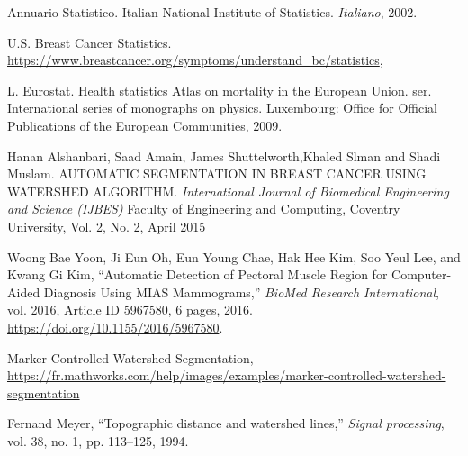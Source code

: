 \documentclass{article}
\begin{document}
%
%

\begin{thebibliography}{5}
    
	Annuario Statistico. Italian National Institute of Statistics. {\em Italiano},
	2002.
    
	U.S. Breast Cancer Statistics. \url{https://www.breastcancer.org/symptoms/understand_bc/statistics},

	L. Eurostat. Health statistics Atlas on mortality in the European Union. ser. International series of monographs on physics. Luxembourg: Office for Official Publications of the European Communities, 2009.
	
	Hanan Alshanbari, Saad Amain, James Shuttelworth,Khaled Slman and Shadi Muslam. AUTOMATIC SEGMENTATION IN BREAST CANCER USING WATERSHED ALGORITHM. {\em International Journal of Biomedical Engineering and Science (IJBES)} Faculty of Engineering and Computing, Coventry University, Vol. 2, No. 2, April 2015
	
	Woong Bae Yoon, Ji Eun Oh, Eun Young Chae, Hak Hee Kim, Soo Yeul Lee, and Kwang Gi Kim, “Automatic Detection of Pectoral Muscle Region for Computer-Aided Diagnosis Using MIAS Mammograms,”   {\em BioMed Research International}, vol. 2016, Article ID 5967580, 6 pages, 2016.  \url{https://doi.org/10.1155/2016/5967580}.

	Marker-Controlled Watershed Segmentation, \url{https://fr.mathworks.com/help/images/examples/marker-controlled-watershed-segmentation}

Fernand Meyer, “Topographic distance and watershed lines,”  {\em Signal processing}, vol. 38, no. 1, pp. 113–125, 1994.

\end{thebibliography}
\end{document}
